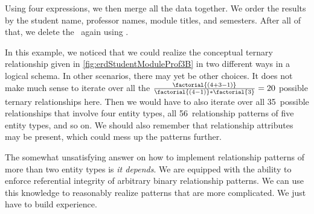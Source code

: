 Using four  expressions, we then merge all the data together.
We order the results by the student name, professor names, module titles, and semesters.
After all of that, we delete the \db\ again using .

In this example, we noticed that we could realize the conceptual ternary relationship given in \cref{fig:erdStudentModuleProf3B} in two different ways in a logical schema.
In other scenarios, there may yet be other choices.
It does not make much sense to iterate over all the $\frac{\factorial{(4+3-1)}}{\factorial{(4-1)}*\factorial{3}}=20$ possible ternary relationships here.
Then we would have to also iterate over all 35~possible relationships that involve four entity types, all 56~relationship patterns of five entity types, and so on.
We should also remember that relationship attributes may be present, which could mess up the patterns further.

The somewhat unsatisfying answer on how to implement relationship patterns of more than two entity types is \emph{it depends}.
We are equipped with the ability to enforce referential integrity of arbitrary binary relationship patterns.
We can use this knowledge to reasonably realize patterns that are more complicated.
We just have to build experience.%
\FloatBarrier%
\endhsection%
%
